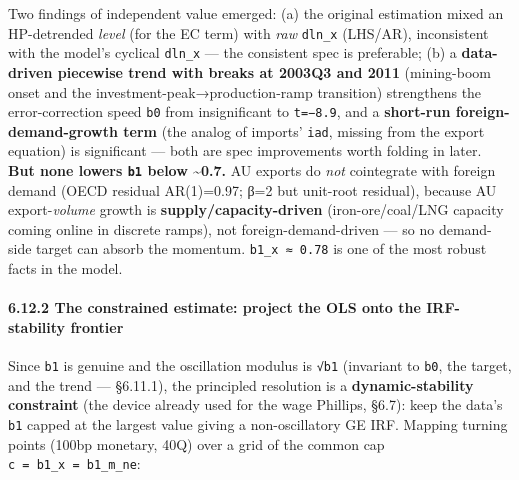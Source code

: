 \documentclass[
]{article}
\newcounter{none} %
\begin{document}
Two findings of independent value emerged: (a) the original estimation
mixed an HP-detrended \emph{level} (for the EC term) with \emph{raw}
\texttt{dln\_x} (LHS/AR), inconsistent with the model's cyclical
\texttt{dln\_x} --- the consistent spec is preferable; (b) a
\textbf{data-driven piecewise trend with breaks at 2003Q3 and 2011}
(mining-boom onset and the investment-peak→production-ramp transition)
strengthens the error-correction speed \texttt{b0} from insignificant to
\texttt{t=−8.9}, and a \textbf{short-run foreign-demand-growth term}
(the analog of imports' \texttt{iad}, missing from the export equation)
is significant --- both are spec improvements worth folding in later.
\textbf{But none lowers \texttt{b1} below \textasciitilde0.7.} AU
exports do \emph{not} cointegrate with foreign demand (OECD residual
AR(1)=0.97; β=2 but unit-root residual), because AU export-\emph{volume}
growth is \textbf{supply/capacity-driven} (iron-ore/coal/LNG capacity
coming online in discrete ramps), not foreign-demand-driven --- so no
demand-side target can absorb the momentum. \texttt{b1\_x\ ≈\ 0.78} is
one of the most robust facts in the model.

\paragraph{6.12.2 The constrained estimate: project the OLS onto the
IRF-stability
frontier}\label{the-constrained-estimate-project-the-ols-onto-the-irf-stability-frontier}

Since \texttt{b1} is genuine and the oscillation modulus is \texttt{√b1}
(invariant to \texttt{b0}, the target, and the trend --- §6.11.1), the
principled resolution is a \textbf{dynamic-stability constraint} (the
device already used for the wage Phillips, §6.7): keep the data's
\texttt{b1} capped at the largest value giving a non-oscillatory GE IRF.
Mapping turning points (100bp monetary, 40Q) over a grid of the common
cap \texttt{c\ =\ b1\_x\ =\ b1\_m\_ne}:
\end{document}

